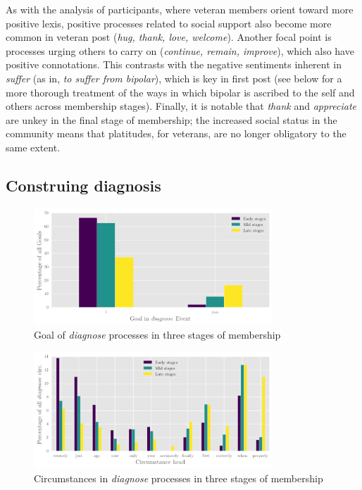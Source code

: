 \documentclass{article}
\begin{document}
{As with the analysis of participants, where veteran members orient toward more positive lexis, positive processes related to social support also become more common in veteran post (\emph{hug, thank, love, welcome}). Another focal point is processes urging others to carry on (\emph{continue, remain, improve}), which also have positive connotations. This contrasts with the negative sentiments inherent in \emph{suffer} (as in, \emph{to suffer from bipolar}), which is key in first post (see below for a more thorough treatment of the ways in which bipolar is ascribed to the self and others across membership stages). Finally, it is notable that \emph{thank} and \emph{appreciate} are unkey in the final stage of membership; the increased social status in the community means that platitudes, for veterans, are no longer obligatory to the same extent.

\subsection{Construing diagnosis} \label{sect:diag}


\begin{figure}[htb]
    \centering
    \includegraphics[width=0.8\textwidth]{images/goal-in-diag-ev.png}
    \caption[Goal of \emph{diagnose} processes]{Goal of \emph{diagnose} processes in three stages of membership}
    \label{fig:part_in_diag}
    \end{figure}

    \begin{figure}[htb]
    \centering
    \includegraphics[width=0.8\textwidth]{images/diag-circ.png}
    \caption[Circumstances in \emph{diagnose} processes]{Circumstances in \emph{diagnose} processes in three stages of membership}
    \label{fig:circ_in_diag}
    \end{figure}

}
\end{document}
